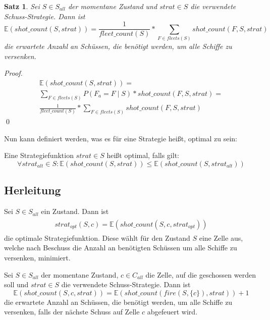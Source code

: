 \documentclass[a4paper,12pt]{llncs}
\numberwithin{equation}{section}
\newtheorem{satz}{Satz}
\begin{document}
\begin{satz}
Sei $S\in S_{all}$ der momentane Zustand und $strat \in S$ die verwendete Schuss-Strategie.
Dann ist
\[
\mathds{E}(shot\_count(S, strat))=\frac{1}{fleet\_count(S)} * \sum_{F \in fleets(S)}{shot\_count(F, S, strat)}
\]
die erwartete Anzahl an Schüssen, die benötigt werden, um alle Schiffe zu versenken.
\end{satz}

\begin{proof}
\begin{align}
\mathds{E}(shot\_count(S, strat))=\\
\sum_{F \in fleets(S)}{P(F_a= F \mid S) * shot\_count(F, S, strat)} =\\
\frac{1}{fleet\_count(S)} * \sum_{F \in fleets(S)}{shot\_count(F, S, strat)}
\end{align}
\qed
\end{proof}

Nun kann definiert werden, was es für eine Strategie heißt, optimal zu sein:
\begin{definition}
Eine Strategiefunktion $strat \in S$ heißt optimal, falls gilt:
\[
\forall strat_{alt} \in S \colon \mathds{E}(shot\_count(S, strat)) \leq \mathds{E}(shot\_count(S, strat_{alt}))
\]
\end{definition}

\subsection{Herleitung}

\begin{definition}
Sei $S\in S_{all}$ ein Zustand.
Dann ist
\begin{align}
\begin{split}
strat_{opt}(S, c)=\mathds{E}(shot\_count(S, c, strat_{opt}))
\end{split}
\end{align}
die optimale Strategiefunktion.
Diese wählt für den Zustand $S$ eine Zelle aus, welche nach Beschuss die Anzahl an benötigten Schüssen um alle Schiffe zu versenken, minimiert.
\end{definition}


\begin{lemma}
Sei $S\in S_{all}$ der momentane Zustand, $c\in C_{all}$ die Zelle, auf die geschossen werden soll und $strat \in S$ die verwendete Schuss-Strategie.
Dann ist
\[
\mathds{E}(shot\_count(S, c, strat))=\mathds{E}(shot\_count(fire(S, \{c\}), strat)) + 1
\]
die erwartete Anzahl an Schüssen, die benötigt werden, um alle Schiffe zu versenken, falls der nächste Schuss auf Zelle $c$ abgefeuert wird.
\end{lemma}
\end{document}
